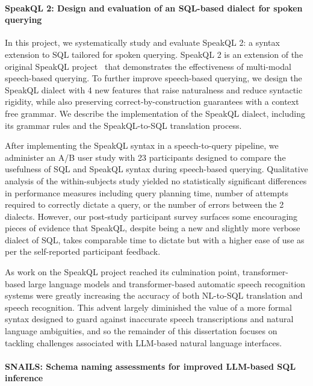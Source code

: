 \paragraph{\textbf{SpeakQL 2: Design and evaluation of an SQL-based dialect for spoken querying}}

In this project, we systematically study and evaluate SpeakQL 2: a syntax extension to SQL tailored for spoken querying.
SpeakQL 2 is an extension of the original SpeakQL project~\cite{Shah2020} that demonstrates the effectiveness of multi-modal speech-based querying.
To further improve speech-based querying, we design the SpeakQL dialect with 4 new features that raise naturalness and reduce syntactic rigidity, while also preserving correct-by-construction guarantees with a context free grammar.
We describe the implementation of the SpeakQL dialect, including its grammar rules and the SpeakQL-to-SQL translation process.

After implementing the SpeakQL syntax in a speech-to-query pipeline, we administer an A/B user study with 23 participants designed to compare the usefulness of SQL and SpeakQL syntax during speech-based querying.
Qualitative analysis of the within-subjects study yielded no statistically significant differences in performance measures including query planning time, number of attempts required to correctly dictate a query, or the number of errors between the 2 dialects.
However, our post-study participant survey surfaces some encouraging pieces of evidence that SpeakQL, despite being a new and slightly more verbose dialect of SQL, takes comparable time to dictate but with a higher ease of use as per the self-reported participant feedback.

As work on the SpeakQL project reached its culmination point, transformer-based large language models and transformer-based automatic speech recognition systems were greatly increasing the accuracy of both NL-to-SQL translation and speech recognition.
This advent largely diminished the value of a more formal syntax designed to guard against inaccurate speech transcriptions and natural language ambiguities, and so the remainder of this dissertation focuses on tackling challenges associated with LLM-based natural language interfaces.

\paragraph{\textbf{SNAILS: Schema naming assessments for improved LLM-based SQL inference}}

